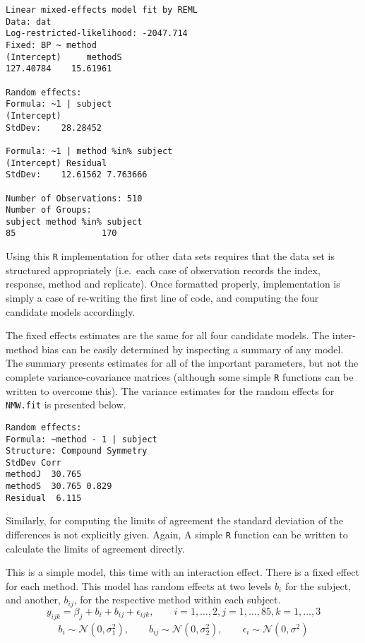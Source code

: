 \documentclass[12pt, a4paper]{report}
\theoremstyle{plain}
\theoremstyle{definition}
\theoremstyle{remark}
\begin{document}
\begin{verbatim}
Linear mixed-effects model fit by REML
Data: dat
Log-restricted-likelihood: -2047.714
Fixed: BP ~ method
(Intercept)     methodS
127.40784    15.61961

Random effects:
Formula: ~1 | subject
(Intercept)
StdDev:    28.28452

Formula: ~1 | method %in% subject
(Intercept) Residual
StdDev:    12.61562 7.763666

Number of Observations: 510
Number of Groups:
subject method %in% subject
85                 170
\end{verbatim}

Using this \texttt{R} implementation for other data sets requires that the data set is structured appropriately (i.e.\ each case of observation records the index, response, method and replicate). Once formatted properly, implementation is simply a case of re-writing the first line of code, and computing the four candidate models accordingly.


The fixed effects estimates are the same for all four candidate models. The inter-method bias can be easily determined by inspecting a summary of any model. The summary presents estimates for all of the important parameters, but not the complete variance-covariance matrices (although some simple \texttt{R} functions can be written to overcome this). The variance estimates for the random effects for \texttt{NMW.fit} is presented below.

\begin{verbatim}
Random effects:
Formula: ~method - 1 | subject
Structure: Compound Symmetry
StdDev Corr
methodJ  30.765
methodS  30.765 0.829
Residual  6.115
\end{verbatim}

Similarly, for computing the limits of agreement the standard deviation of the differences is not explicitly given. Again, A simple \texttt{R} function can be written to calculate the limits of agreement directly.




This is a simple model, this time with an interaction effect.
There is a fixed effect for each method. This model has random effects at two levels $b_{i}$ for the subject, and
another, $b_{ij}$, for the respective method within each subject.
\begin{equation*}
y_{ijk} = \beta_{j}  + b_{i} + b_{ij} + \epsilon_{ijk}, \qquad i=1,\dots,2, j=1,\dots,85, k=1,\dots,3
\end{equation*}
\begin{eqnarray*}
	b_{i} \sim \mathcal{N}(0,\sigma^2_{1}), \qquad b_{ij} \sim \mathcal{N}(0,\sigma^2_{2}), \qquad \epsilon_{i} \sim \mathcal{N}(0,\sigma^2)
\end{eqnarray*}
\end{document}
